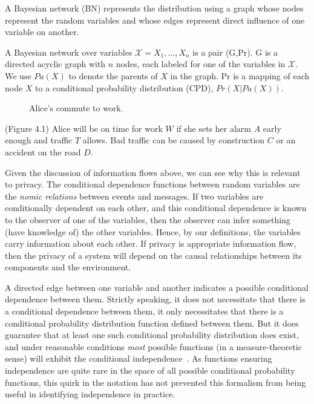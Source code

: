 \documentclass[../thesis.tex]{subfiles}
\begin{document}
A Bayesian network (BN) represents the distribution using a graph
whose nodes represent the random variables and whose edges represent
direct influence of one variable on another.

\begin{dfn}
A Bayesian network over variables $\mathcal{X} = X_1, ..., X_n$ is 
a pair (G,Pr). G is a directed acyclic graph with $n$ nodes, 
each labeled for one of the variables in $\mathcal{X}$. We use
$Pa(X)$ to denote the parents of $X$ in the graph. Pr is a mapping
of each node $X$ to a conditional probability distribution (CPD),
$Pr(X \vert Pa(X))$.
\end{dfn}
 
\begin{figure}
\begin{center}
\end{center}
\caption{Alice's commute to work.}
\end{figure}

\begin{exm}
  (Figure 4.1) %
  Alice will be on time for work $W$ if she sets her
  alarm $A$ early enough and traffic $T$ allows.
  Bad traffic can be caused by construction $C$
  or an accident on the road $D$.
\end{exm}

Given the discussion of information flows above,
we can see why this
is relevant to privacy. The conditional dependence
functions between
random variables are the \emph{nomic relations}
between events and messages.
If two variables are conditionally dependent on
each other, and this
conditional dependence is known to the observer of one
of the variables,
then the observer can infer something (have knowledge of)
the other
variables. Hence, by our definitions, the variables carry
information about each other.
If privacy is appropriate information flow, then
the privacy of a system will depend on the
causal relationships between its components
and the environment.

A directed edge between one variable and another
indicates a possible
conditional dependence between them.
Strictly speaking, it does not
necessitate that there is a conditional dependence between them,
it only necessitates that there is a conditional
probability distribution
function defined between them.
But it does guarantee that at least one such conditional
probability distribution does exist, and under reasonable
conditions \emph{most} possible functions
(in a measure-theoretic sense) will exhibit
the conditional independence~\cite{meek1995strong}.
As functions ensuring
independence are quite rare in the space of all possible
conditional probability functions, this quirk in the
notation has not prevented
this formalism from being useful in identifying
independence in practice.
\end{document}
